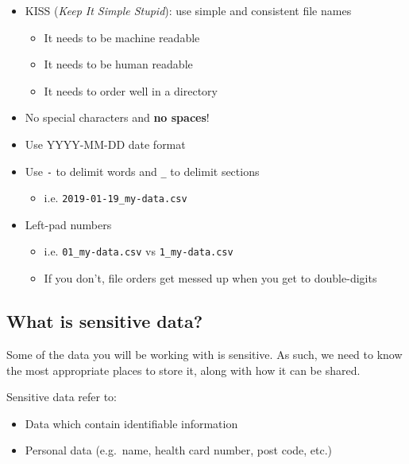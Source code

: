 \documentclass[]{book}
\providecommand{\tightlist}{%
  \setlength{\itemsep}{0pt}\setlength{\parskip}{0pt}}
\begin{document}
\begin{itemize}
\tightlist
\item
  KISS (\emph{Keep It Simple Stupid}): use simple and consistent file names

  \begin{itemize}
  \tightlist
  \item
    It needs to be machine readable
  \item
    It needs to be human readable
  \item
    It needs to order well in a directory
  \end{itemize}
\item
  No special characters and \textbf{no spaces}!
\item
  Use YYYY-MM-DD date format
\item
  Use \texttt{-} to delimit words and \texttt{\_} to delimit sections

  \begin{itemize}
  \tightlist
  \item
    i.e. \texttt{2019-01-19\_my-data.csv}
  \end{itemize}
\item
  Left-pad numbers

  \begin{itemize}
  \tightlist
  \item
    i.e. \texttt{01\_my-data.csv} vs \texttt{1\_my-data.csv}
  \item
    If you don't, file orders get messed up when you get to double-digits
  \end{itemize}
\end{itemize}

\hypertarget{what-is-sensitive-data}{%
\subsection{What is sensitive data?}\label{what-is-sensitive-data}}

Some of the data you will be working with is sensitive. As such, we need to know the most appropriate places to store it, along with how it can be shared.

Sensitive data refer to:

\begin{itemize}
\tightlist
\item
  Data which contain identifiable information
\item
  Personal data (e.g.~name, health card number, post code, etc.)
\end{itemize}
\end{document}
